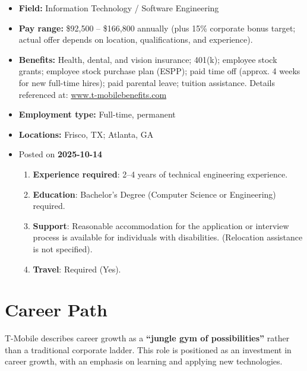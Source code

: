 \documentclass[11pt]{article}
\begin{document}
\begin{itemize}
  \item \textbf{Field:} Information Technology / Software Engineering
  \item \textbf{Pay range:} \$92,500 -- \$166,800 annually (plus 15\% corporate bonus target; 
    actual offer depends on location, qualifications, and experience).
  \item \textbf{Benefits:} Health, dental, and vision insurance; 401(k); 
    employee stock grants; employee stock purchase plan (ESPP); paid time off 
    (approx. 4 weeks for new full-time hires); paid parental leave; 
    tuition assistance. Details referenced at: 
    \url{www.t-mobilebenefits.com}
  \item \textbf{Employment type:} Full-time, permanent
  \item \textbf{Locations:} Frisco, TX; Atlanta, GA
  \item Posted on \textbf{2025-10-14}
  \begin{enumerate}[label=\arabic*., leftmargin=*]
    \item \textbf{Experience required}: 2--4 years of technical engineering 
      experience.
    \item \textbf{Education}: Bachelor's Degree (Computer Science or 
      Engineering) required.
    \item \textbf{Support}: Reasonable accommodation for the application or 
      interview process is available for individuals with disabilities. 
      (Relocation assistance is not specified).
    \item \textbf{Travel}: Required (Yes).
  \end{enumerate}
\end{itemize}

\section*{Career Path}
T-Mobile describes career growth as a \textbf{``jungle gym of possibilities''} 
rather than a traditional corporate ladder. This role is positioned as an 
investment in career growth, with an emphasis on learning and applying 
new technologies.

\newpage
\end{document}
